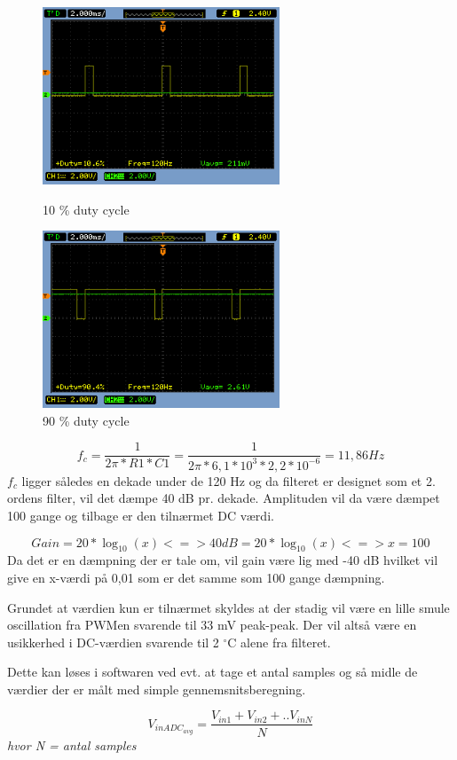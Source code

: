\begin{figure}[htb]
\begin{minipage}{0.4\textwidth} 
\includegraphics[height=150pt]{filer/design/Billeder/sht_dutycycle10.png}
\caption{\textnormal{10 \% duty cycle}}
\label{lab:sht_dc10}
\end{minipage}
\hspace{0.10\textwidth}
\begin{minipage}{0.4\textwidth}
\includegraphics[height=150pt]{filer/design/Billeder/sht_dutycycle90.png}
\caption{\textnormal{90 \% duty cycle}}
\label{lab:sht_dc90}
\end{minipage}
\hfill
\end{figure}

\begin{equation}
f_c = \frac{1}{2 \pi * R1 * C1} = \frac{1}{2 \pi * 6,1*10^3  * 2,2*10^{-6}} = 11,86 Hz
\end{equation}
$f_c$ ligger således en dekade under de 120 Hz og da filteret er designet som et 2. ordens filter, vil det dæmpe 40 dB pr. dekade. Amplituden vil da være dæmpet 100 gange og tilbage er den tilnærmet DC værdi.

\begin{equation}
Gain = 20 * \log_{10}(x) <=> 40 dB = 20 * \log_ {10}(x) <=> x = 100
\end{equation} 
Da det er en dæmpning der er tale om, vil gain være lig med -40 dB hvilket vil give en x-værdi på 0,01 som er det samme som 100 gange dæmpning.

Grundet at værdien kun er tilnærmet skyldes at der stadig vil være en lille smule oscillation fra PWMen svarende til 33 mV peak-peak. Der vil altså være en usikkerhed i DC-værdien svarende til 2 $^{\circ}$C alene fra filteret.

Dette kan løses i softwaren ved evt. at tage et antal samples og så midle de værdier der er målt med simple gennemsnitsberegning. 

\begin{equation}
V_{inADC_{avg}} = \frac{V_{in1} + V_{in2} + .. V_{inN}}{N}
\end{equation} 
\textit{hvor N = antal samples}